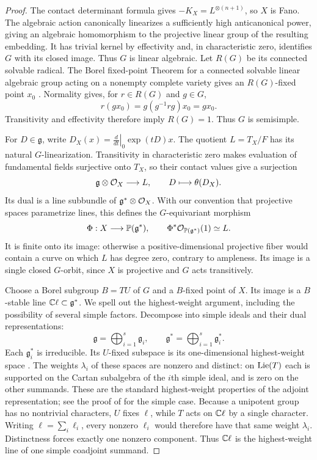 \begin{proof}
The contact determinant formula gives $-K_X=L^{\otimes(n+1)}$,
so $X$ is Fano. The algebraic action canonically linearizes a sufficiently
high anticanonical power, giving an algebraic homomorphism to the projective
linear group of the resulting embedding. It has trivial kernel by
effectivity and, in characteristic zero, identifies $G$ with its closed
image. Thus $G$ is linear algebraic. Let
$R(G)$ be its connected solvable radical. The Borel fixed-point
Theorem for a connected solvable linear algebraic group acting on a
nonempty complete variety gives an $R(G)$-fixed point $x_0$
\cite[Corollary~17.3]{Milne2022}. Normality gives, for
$r\in R(G)$ and $g\in G$,
\[
 r(gx_0)=g(g^{-1}rg)x_0=gx_0.
\]
Transitivity and effectivity therefore imply $R(G)=1$. Thus $G$ is
semisimple.

For $D\in\mathfrak g$, write
$D_X(x)=\left.\frac{d}{dt}\right|_{0}\exp(tD)x$.
The quotient $L=T_X/F$ has its natural $G$-linearization. Transitivity
in characteristic zero makes evaluation of fundamental fields
surjective onto $T_X$, so their contact values give a surjection
\[
 \mathfrak g\otimes\mathcal O_X\longrightarrow L,
 \qquad D\longmapsto\theta(D_X).
\]
Its dual is a line subbundle of $\mathfrak g^*\otimes\mathcal O_X$.
With our convention that projective spaces parametrize lines, this
defines the $G$-equivariant morphism
\begin{equation}\label{hom:moment}
 \Phi:X\longrightarrow\mathbb P(\mathfrak g^*),\qquad
 \Phi^*\mathcal O_{\mathbb P(\mathfrak g^*)}(1)\simeq L.
\end{equation}
It is finite onto its image: otherwise a positive-dimensional
projective fiber would contain a curve on which $L$ has degree zero,
contrary to ampleness. Its image is a single closed $G$-orbit, since
$X$ is projective and $G$ acts transitively.

Choose a Borel subgroup $B=TU$ of $G$ and a $B$-fixed point of $X$.
Its image is a $B$-stable line $\mathbb C\ell\subset\mathfrak g^*$.
We spell out the highest-weight argument, including the possibility
of several simple factors. Decompose into simple ideals and their
dual representations:
\[
 \mathfrak g=\bigoplus_{i=1}^s\mathfrak g_i,
 \qquad \mathfrak g^*=\bigoplus_{i=1}^s\mathfrak g_i^*.
\]
Each $\mathfrak g_i^*$ is irreducible. Its $U$-fixed subspace is its
one-dimensional highest-weight space
\cite[Definition~22.16 and Theorem~22.18]{Milne2022}. The weights $\lambda_i$ of
these spaces are nonzero and distinct: on $\operatorname{Lie}(T)$ each is
supported on the Cartan subalgebra of the $i$th simple ideal, and is
zero on the other summands. These are the standard highest-weight
properties of the adjoint representation; see the proof of
\cite[Proposition~2.6]{Beauville1998} for the simple case.
Because a unipotent group has no nontrivial characters, $U$ fixes
$\ell$, while $T$ acts on $\mathbb C\ell$ by a single character.
Writing $\ell=\sum_i\ell_i$, every nonzero $\ell_i$ would therefore
have that same weight $\lambda_i$. Distinctness forces exactly one
nonzero component. Thus $\mathbb C\ell$ is the highest-weight line of one
simple coadjoint summand.


\end{proof}
